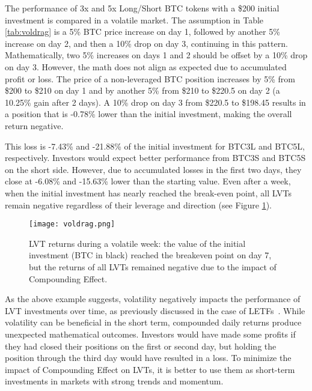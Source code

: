 \begin{example}
	The performance of 3x and 5x Long/Short BTC tokens with a \$200 initial investment is compared in a volatile market. The assumption in Table \ref{tab:voldrag} is a 5\% BTC price increase on day 1, followed by another 5\% increase on day 2, and then a 10\% drop on day 3, continuing in this pattern. Mathematically, two 5\% increases on days 1 and 2 should be offset by a 10\% drop on day 3. However, the math does not align as expected due to accumulated profit or loss. The price of a non-leveraged BTC position increases by 5\% from \$200 to \$210 on day 1 and by another 5\% from \$210 to \$220.5 on day 2 (a 10.25\% gain after 2 days). A 10\% drop on day 3 from \$220.5 to \$198.45 results in a position that is -0.78\% lower than the initial investment, making the overall return negative. 
	
	This loss is -7.43\% and -21.88\% of the initial investment for BTC3L and BTC5L, respectively. Investors would expect better performance from BTC3S and BTC5S on the short side. However, due to accumulated losses in the first two days, they close at -6.08\% and -15.63\% lower than the starting value. Even after a week, when the initial investment has nearly reached the break-even point, all LVTs remain negative regardless of their leverage and direction (see Figure \ref{fig:voldrag}).
	
	\begin{figure}[t]
		\centering
		\texttt{[image: voldrag.png]}
		\caption[Compounding Effect effect in volatile market]{LVT returns during a volatile week: the value of the initial investment (BTC in black) reached the breakeven point on day 7, but the returns of all LVTs remained negative due to the impact of Compounding Effect.}
		\label{fig:voldrag}
	\end{figure}
\end{example}

As the above example suggests, volatility negatively impacts the performance of LVT investments over time, as previously discussed in the case of LETFs~\cite{giese2010performance, trainor2011daily}. While volatility can be beneficial in the short term, compounded daily returns produce unexpected mathematical outcomes. Investors would have made some profits if they had closed their positions on the first or second day, but holding the position through the third day would have resulted in a loss. To minimize the impact of Compounding Effect on LVTs, it is better to use them as short-term investments in markets with strong trends and momentum.

